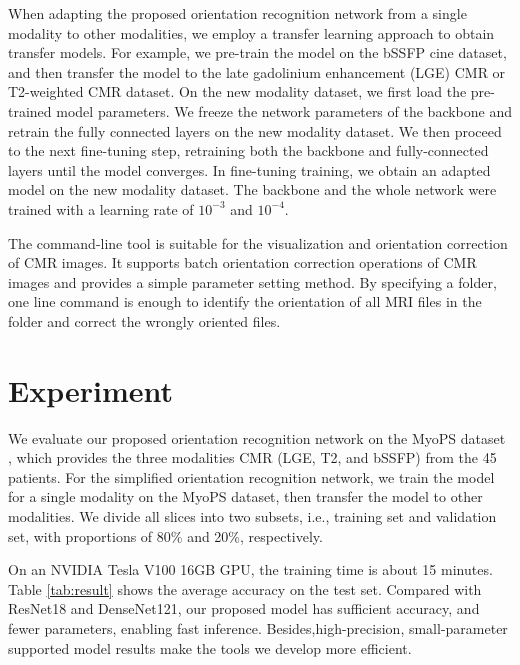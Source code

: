 \documentclass[runningheads]{llncs}
\begin{document}
When adapting the proposed orientation recognition network from a single modality to other modalities, we employ a transfer learning approach to obtain transfer models. For example, we pre-train the model on the bSSFP cine dataset, and then transfer the model to the late gadolinium enhancement (LGE) CMR or T2-weighted CMR dataset. On the new modality dataset, we first load the pre-trained model parameters. We freeze the network parameters of the backbone and retrain the fully connected layers on the new modality dataset. We then proceed to the next fine-tuning step, retraining both the backbone and fully-connected layers until the model converges. In fine-tuning training, we obtain an adapted model on the new modality dataset. The backbone and the whole network were trained with a learning rate of $10^{-3}$ and $10^{-4}$.

The command-line tool is suitable for the visualization and orientation correction of CMR images. It supports batch orientation correction operations of CMR images and provides a simple parameter setting method. By specifying a folder, one line command is enough to identify the orientation of all MRI files in the folder and correct the wrongly oriented files.

\section{Experiment}

We evaluate our proposed orientation recognition network on the MyoPS dataset \cite{PAMI,Spr2016}, which provides the three modalities CMR (LGE, T2, and bSSFP) from the 45 patients. For the simplified orientation recognition network, we train the model for a single modality on the MyoPS dataset, then transfer the model to other modalities. We divide all slices into two subsets, i.e., training set and validation set, with proportions of 80\% and 20\%, respectively.




On an NVIDIA Tesla V100 16GB GPU, the training time is about 15 minutes. Table \ref{tab:result} shows the average accuracy on the test set. Compared with ResNet18 and DenseNet121, our proposed model has sufficient accuracy, and fewer parameters, enabling fast inference. Besides,high-precision, small-parameter supported model results make the tools we develop more efficient.
\end{document}
